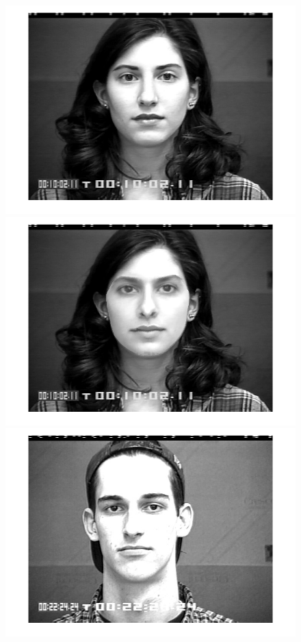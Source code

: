 	\begin{figure}[!htb]
    	\centering
    	\includegraphics[scale=.10]{figure/77/04.png}
    	\includegraphics[scale=.10]{figure/77de/04.png}
    	\hspace{1cm}
    	\includegraphics[scale=.10]{figure/89/05.png}

\end{figure}
